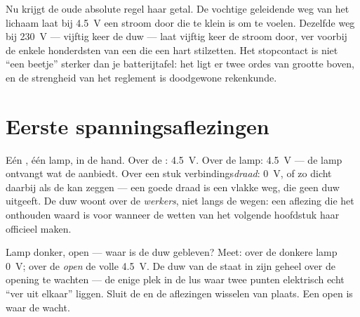 \begin{remark}\label{rem:g8:voltage-voltmeter:mains}
Nu krijgt de oude absolute regel haar getal. De vochtige geleidende weg
van het lichaam laat bij \qty{4.5}{V} een stroom door die te klein is
om te voelen. Dezelfde weg bij \qty{230}{V} --- vijftig keer de duw ---
laat vijftig keer de stroom door, ver voorbij de enkele honderdsten van
een  die een hart stilzetten. Het stopcontact is niet
``een beetje'' sterker dan je batterijtafel: het ligt er twee ordes van
grootte boven, en de strengheid van het reglement is doodgewone
rekenkunde.
\end{remark}

\section{Eerste spanningsaflezingen}

\begin{example}\label{ex:g8:voltage-voltmeter:readings}
Eén , één lamp,  in de hand. Over de
: \qty{4.5}{V}. Over de lamp: \qty{4.5}{V} --- de lamp
ontvangt wat de  aanbiedt. Over een stuk
verbindings\emph{draad}: \qty{0}{V}, of zo dicht daarbij als de 
kan zeggen --- een goede draad is een vlakke weg, die geen duw uitgeeft.
De duw woont over de \emph{werkers}, niet langs de wegen: een aflezing
die het onthouden waard is voor wanneer de wetten van het volgende
hoofdstuk haar officieel maken.
\end{example}

\begin{example}\label{ex:g8:voltage-voltmeter:openswitch}
Lamp donker,  open --- waar is de duw gebleven? Meet:
over de donkere lamp \qty{0}{V}; over de \emph{open
} de volle \qty{4.5}{V}. De duw van de
 staat in zijn geheel over de opening te wachten --- de
enige plek in de lus waar twee punten elektrisch echt ``ver uit elkaar''
liggen. Sluit de  en de aflezingen wisselen van plaats.
Een open  is waar de  wacht.
\end{example}

